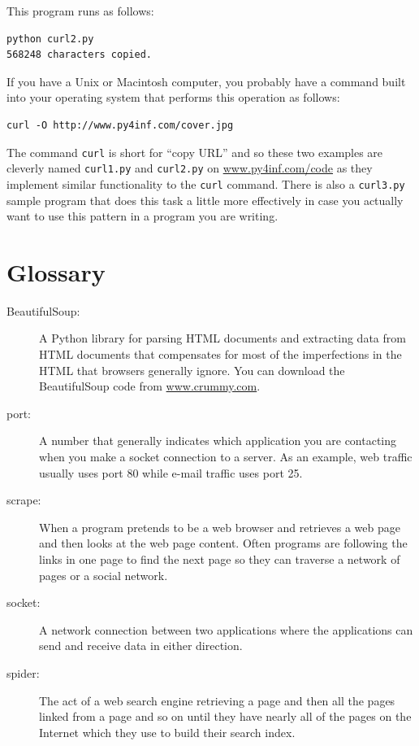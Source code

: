 \documentclass[10pt]{book}
\begin{document}
This program runs as follows:

\beforeverb
\begin{verbatim}
python curl2.py 
568248 characters copied.
\end{verbatim}
\afterverb
%

If you have a Unix or Macintosh computer, you probably have a command
built into your operating system that performs this operation
as follows:

\beforeverb
\begin{verbatim}
curl -O http://www.py4inf.com/cover.jpg
\end{verbatim}
\afterverb
%
The command {\tt curl} is short for ``copy URL'' and so these two 
examples are cleverly named {\tt curl1.py} and {\tt curl2.py} on 
\url{www.py4inf.com/code} as they implement similar functionality
to the {\tt curl} command.  There is also a {\tt curl3.py} sample 
program that does this task a little more effectively in case you
actually want to use this pattern in a program you are writing.

\section{Glossary}

\begin{description}

\item[BeautifulSoup:] A Python library for parsing HTML documents
and extracting data from HTML documents
that compensates for most of the imperfections in the HTML that browsers
generally ignore.
You can download the BeautifulSoup code
from 
\url{www.crummy.com}.

\item[port:] A number that generally indicates which application 
you are contacting when you make a socket connection to a server.
As an example, web traffic usually uses port 80 while e-mail 
traffic uses port 25.

\item[scrape:] When a program pretends to be a web browser and
retrieves a web page and then looks at the web page content. 
Often programs are following the links in one page to find the next
page so they can traverse a network of pages or a social network.

\item[socket:] A network connection between two applications
where the applications can send and receive data in either direction.

\item[spider:] The act of a web search engine retrieving a page and
then all the pages linked from a page and so on until they have 
nearly all of the pages on the Internet which they 
use to build their search index.

\end{description}
\end{document}

